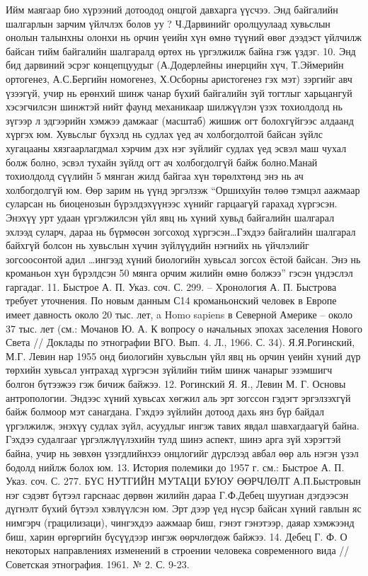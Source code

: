 Ийм маягаар био хүрээний дотоодод онцгой давхарга үүсчээ. Энд байгалийн шалгарлын зарчим үйлчлэх болов уу ?
Ч.Дарвинийг оролцуулаад хувьслын онолын талынхны олонхи нь орчин үеийн хүн өмнө түүний өвөг дээдэст үйлчилж байсан тийм байгалийн шалгаралд өртөх нь үргэлжилж байна гэж үздэг.
10. Энд бид дарвиний эсрэг концепцуудыг (А.Додерлейны инерцийн хүч, Т.Эймерийн ортогенез, А.С.Бергийн номогенез, Х.Осборны аристогенез гэх мэт) зэргийг авч үзээгүй, учир нь ерөнхий шинж чанар бүхий байгалийн зүй тогтлыг харьцангуй хэсэгчилсэн шинжтэй нийт фаунд механикаар шилжүүлэн үзэх тохиолдолд нь зүгээр л эдгээрийн хэмжээ дамжааг (масштаб) жишиж огт болохгүйгээс алдаанд хүргэх юм. Хувьслыг бүхэлд нь судлах үед ач холбогдолтой байсан зүйлс хугацааны хязгаарлагдмал хэрчим дэх нэг зүйлийг судлах үед эсвэл маш чухал болж болно, эсвэл тухайн зүйлд огт ач холбогдолгүй байж болно.Манай тохиолдолд сүүлийн 5 мянган жилд байгаа хүн төрөлхтөнд энэ нь ач холбогдолгүй юм.
Өөр зарим нь үүнд эргэлзэж “Оршихуйн төлөө тэмцэл аажмаар суларсан нь биоценозын бүрэлдэхүүнээс хүнийг гарцаагүй гарахад хүргэсэн. Энэхүү урт удаан үргэлжилсэн үйл явц нь хүний хувьд байгалийн шалгарал эхлээд суларч, дараа нь бүрмөсөн зогсоход хүргэсэн…Гэхдээ байгалийн шалгарал байхгүй болсон нь хувьслын хүчин зүйлүүдийн нэгнийх нь үйчлэлийг зогсоосонтой адил …ингээд хүний биологийн хувьсал зогсох ёстой байсан. Энэ нь кроманьон хүн бүрэлдсэн 50 мянга орчим жилийн өмнө болжээ” гэсэн үндэслэл гаргадаг. 11. Быстрое А. П. Указ. соч. С. 299. – Хронология А. П. Быстрова требует уточнения. По новым данным С14 кроманьонский человек в Европе имеет давность около 20 тыс. лет, a Homo sapiens в Северной Америке – около 37 тыс. лет (см.: Мочанов Ю. А. К вопросу о начальных эпохах заселения Нового Света // Доклады по этнографии ВГО. Вып. 4. Л., 1966. С. 34).
Я.Я.Рогинский, М.Г. Левин нар 1955 онд биологийн хувьслын үйл явц нь орчин үеийн хүний дүр төрхийн хувьсал унтрахад хүргэсэн зүйлийн тийм шинж чанарыг эзэмшигч болгон бүтээжээ гэж бичиж байжээ. 12. Рогинский Я. Я., Левин М. Г. Основы антропологии.
Эндээс хүний хувьсах хөгжил аль эрт зогссон гэдэгт эргэлзэхгүй байж болмоор мэт санагдана. Гэхдээ зүйлийн дотоод дахь янз бүр байдал үргэлжилж, энэхүү судлах зүйл, асуудлыг ингэж тавих явдал шавхагдаагүй байна. Гэхдээ судалгааг үргэлжлүүлэхийн тулд шинэ аспект, шинэ арга зүй хэрэгтэй байна, учир нь зөвхөн үзэгдлийнхээ онцлогийг дүрслээд авбал өөр аль нэгэн үзэл бодолд нийлж болох юм. 13. История полемики до 1957 г. см.: Быстрое А. П. Указ. соч. С. 277.
БҮС НУТГИЙН МУТАЦИ БУЮУ ӨӨРЧЛӨЛТ
А.П.Быстровын нэг сэдэвт бүтээл гарснаас дөрвөн жилийн дараа Г.Ф.Дебец шуугиан дэгдээсэн дүгнэлт бүхий бүтээл хэвлүүлсэн юм. Эрт дээр үед нүсэр байсан хүний гавлын яс нимгэрч (грацилизаци), чингэхдээ аажмаар биш, гэнэт гэнэтээр, даяар хэмжээнд биш, харин өргөргийн бүсүүдээр ингэж өөрчлөгдөж байжээ. 14. Дебец Г. Ф. О некоторых направлениях изменений в строении человека современного вида //Советская этнография. 1961. № 2. С. 9-23.
